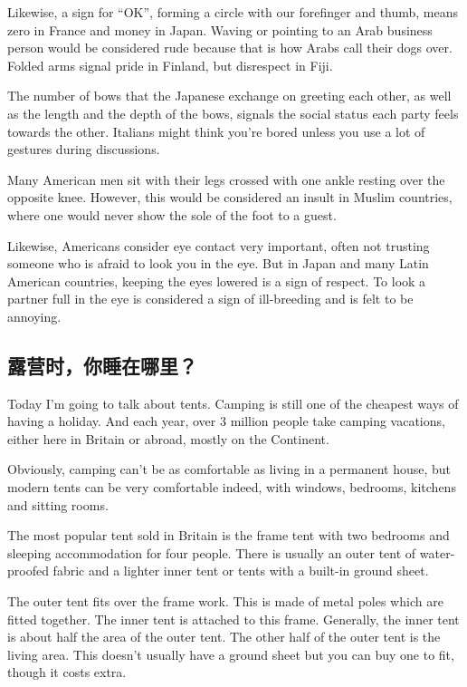 Likewise, a sign for “OK”, forming a circle with our forefinger
and thumb, means zero in France and money in Japan.
Waving or pointing to an Arab business person
would be considered rude because that is how Arabs call
their dogs over. Folded arms signal pride in Finland, but
disrespect in Fiji.

The number of bows that the Japanese exchange on
greeting each other, as well as the length and the depth of
the bows, signals the social status each party feels towards
the other. Italians might think you're bored unless you use
a lot of gestures during discussions.

Many American men sit with their legs crossed with one
ankle resting over the opposite knee. However, this
would be considered an insult in Muslim countries, where
one would never show the sole of the foot to a guest.

Likewise, Americans consider eye contact very important,
often not trusting someone who is afraid to look you in the
eye. But in Japan and many Latin American countries,
keeping the eyes lowered is a sign of respect. To look a
partner full in the eye is considered a sign of ill-breeding
and is felt to be annoying.

\subsection{露营时，你睡在哪里？}
\begin{margintable}\vspace{-2cm}\footnotesize
\end{margintable}
Today I'm going to talk about tents. Camping is still
one of the cheapest ways of having a holiday. And each
year, over 3 million people take camping vacations, either
here in Britain or abroad, mostly on the Continent.

Obviously, camping can't be as comfortable as living in a
permanent house, but modern tents can be very comfortable
indeed, with windows, bedrooms, kitchens and sitting
rooms.

The most popular tent sold in Britain is the frame
tent with two bedrooms and sleeping accommodation for
four people. There is usually an outer tent of water-
proofed fabric and a lighter inner tent or tents with a
built-in ground sheet.

The outer tent fits over the frame work. This is made of
metal poles which are fitted together. The inner tent is attached
to this frame. Generally, the inner tent is about half
the area of the outer tent. The other half of the outer tent is
the living area. This doesn't usually have a ground sheet
but you can buy one to fit, though it costs extra.

